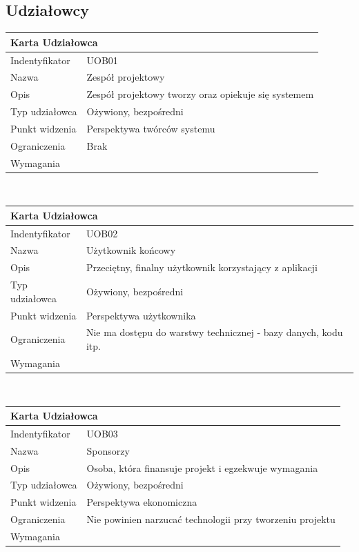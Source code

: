 \documentclass[a4paper,11pt]{report}
\begin{document}
\subsection {Udziałowcy}
\begin{tabular}{|p{3cm}|p{11cm}|}
	\hline
	\multicolumn{2}{|l|}{\textbf{Karta Udziałowca}}\\
	\hline
	Indentyfikator&UOB01\\
	\hline
	Nazwa&Zespół projektowy\\
	\hline
	Opis&Zespół projektowy tworzy oraz opiekuje się systemem\\
	\hline
	Typ udziałowca&Ożywiony, bezpośredni\\
	\hline
	Punkt widzenia&Perspektywa twórców systemu\\
	\hline
	Ograniczenia&Brak\\
	\hline
	Wymagania&\\
	\hline
	\end{tabular}\\
	\begin{tabular}{|p{3cm}|p{11cm}|}
	\hline
	\multicolumn{2}{|l|}{\textbf{Karta Udziałowca}}\\
	\hline
	Indentyfikator&UOB02\\
	\hline
	Nazwa&Użytkownik końcowy\\
	\hline
	Opis&Przeciętny, finalny użytkownik korzystający z aplikacji\\
	\hline
	Typ udziałowca&Ożywiony, bezpośredni\\
	\hline
	Punkt widzenia&Perspektywa użytkownika\\
	\hline
	Ograniczenia&Nie ma dostępu do warstwy technicznej - bazy danych, kodu itp.\\
	\hline
	Wymagania&\\
	\hline
	\end{tabular}\\
	\begin{tabular}{|p{3cm}|p{11cm}|}
	\hline
	\multicolumn{2}{|l|}{\textbf{Karta Udziałowca}}\\
	\hline
	Indentyfikator&UOB03\\
	\hline
	Nazwa&Sponsorzy\\
	\hline
	Opis&Osoba, która finansuje projekt i egzekwuje wymagania\\
	\hline
	Typ udziałowca&Ożywiony, bezpośredni\\
	\hline
	Punkt widzenia&Perspektywa ekonomiczna\\
	\hline
	Ograniczenia&Nie powinien narzucać technologii przy tworzeniu projektu\\
	\hline
	Wymagania&\\
	\hline
	\end{tabular}\\
\end{document}
